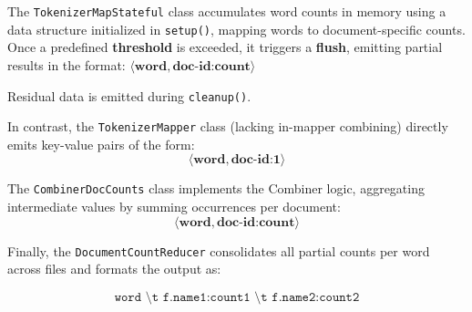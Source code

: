 The \texttt{TokenizerMapStateful} class accumulates word counts in memory using a data structure initialized in \texttt{setup()}, mapping words to document-specific counts. Once a predefined \textbf{threshold} is exceeded, it triggers a \textbf{flush}, emitting partial results in the format: $\langle \textbf{word}, \textbf{doc-id:count} \rangle$

Residual data is emitted during \texttt{cleanup()}.

In contrast, the \texttt{TokenizerMapper} class (lacking in-mapper combining) directly emits key-value pairs of the form:
\[
\langle \textbf{word}, \textbf{doc-id:1} \rangle
\]

The \texttt{CombinerDocCounts} class implements the Combiner logic, aggregating intermediate values by summing occurrences per document:
\[
\langle \textbf{word}, \textbf{doc-id:count} \rangle
\]

Finally, the \texttt{DocumentCountReducer} consolidates all partial counts per word across files and formats the output as:

\[
\texttt{word \textbackslash t f.name1:count1 \textbackslash t f.name2:count2}
\]

